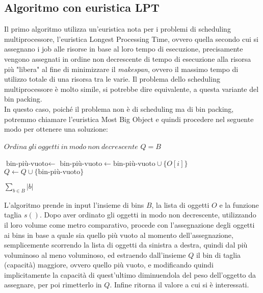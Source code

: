 \subsection{Algoritmo con euristica LPT}
Il primo algoritmo utilizza un'euristica nota per i problemi di scheduling multiprocessore, l'euristica Longest Processing Time, ovvero
quella secondo cui si assegnano i job alle risorse in base al loro tempo di esecuzione, precisamente vengono assegnati in ordine non decrescente di 
tempo di esecuzione alla risorsa più "libera" al fine di minimizzare il \textit{makespan}, ovvero il massimo tempo di utilizzo totale di una risorsa tra le varie.
Il problema dello scheduling multiprocessore è molto simile, si potrebbe dire equivalente, a questa variante del bin packing. \\
In questo caso, poiché il problema non è di scheduling ma di bin packing, potremmo chiamare l'euristica Most Big Object e quindi procedere nel
seguente modo per ottenere una soluzione:
\begin{algorithm}[H]
\begin{algorithmic}[1]

    \State $ Ordina \: gli \: oggetti \: in \: modo \: non \: decrescente $
    \State $ Q = B $

        \State $ \text{bin-più-vuoto} \leftarrow $ 
        \State $ \text{bin-più-vuoto} \leftarrow \text{bin-più-vuoto} \cup \{O[i]\} $
        \State $ Q \leftarrow Q \cup \{\text{bin-più-vuoto}\} $
    \EndFor
    
    \State \Return $ \displaystyle\sum\limits_{b \in B} |b| $
\EndFunction

\end{algorithmic}
\end{algorithm}

\noindent
L'algoritmo prende in input l'insieme di bins $ B $, la lista di oggetti $ O $ e la funzione taglia $ s() $. Dopo aver ordinato gli oggetti in modo
non decrescente, utilizzando il loro volume come metro comparativo, procede con l'assegnazione degli oggetti ai bins in base a quale sia quello più
vuoto al momento dell'assegnazione, semplicemente scorrendo la lista di oggetti da sinistra a destra, quindi dal più voluminoso al meno voluminoso, ed estraendo
dall'insieme $ Q $ il bin di taglia (capacità) maggiore, ovvero quello più vuoto, e modificando quindi implicitamente la capacità di quest'ultimo diminuendola
del peso dell'oggetto da assegnare, per poi rimetterlo in $ Q $. Infine ritorna il valore a cui si è interessati. 

